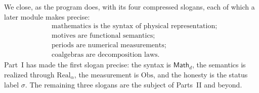 \documentclass[12pt]{article}
\theoremstyle{definition}
\theoremstyle{remark}
\newcommand{\Math}{\mathsf{Math}}
\newcommand{\Real}{\mathrm{Real}}
\newcommand{\Obs}{\mathrm{Obs}}
\begin{document}
We close, as the program does, with its four compressed slogans, each of which a
later module makes precise:
\[
\boxed{
\begin{aligned}
&\text{mathematics is the syntax of physical representation;}\\
&\text{motives are functional semantics;}\\
&\text{periods are numerical measurements;}\\
&\text{coalgebras are decomposition laws.}
\end{aligned}}
\]
Part~I has made the first slogan precise: the syntax is $\Math_d$, the semantics
is realized through $\Real_\alpha$, the measurement is $\Obs$, and the honesty is
the status label $\sigma$. The remaining three slogans are the subject of
Parts~II and beyond.

\end{document}
